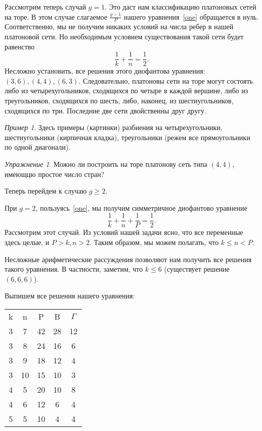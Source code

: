\documentclass[12pt, a4paper, openany]{amsart}
\theoremstyle{plain}
\theoremstyle{definition}
\theoremstyle{remark}
\newtheorem{ex}[theorem]{Упражнение}
\newtheorem{e}[theorem]{Пример}
\begin{document}
	  Рассмотрим теперь случай $g=1$. Это даст нам классификацию платоновых сетей на торе. В этом случае слагаемое $\frac{g-1}{P}$ нашего уравнения~\ref{one} обращается в нуль.  Соответственно, мы не получим никаких условий на числа ребер в нашей платоновой сети. Но необходимым условием существования такой сети будет равенство 
	  $$
	  \frac{1}{k}+\frac{1}{n}=\frac{1}{2}.
	  $$
	   Несложно установить, все решения этого диофантова уравнения:
	   $(3,6), (4,4), (6,3)$. Следовательно, платоновы сети на торе могут состоять либо из четырехугольников, сходящихся по четыре в каждой вершине,
	   либо из треугольников, сходящихся по шесть, либо, наконец, из шестиугольников, сходящихся по три. Последние две сети двойственны друг
	   другу. 
	   
\begin{e}
Здесь примеры (картинки) разбиения на четырехугольники, шестиугольники (кирпичная кладка), треугольники (режем все прямоугольники по одной диагонали).	
	
	\end{e}	   
	   
\begin{ex}
	Можно ли построить на торе платонову сеть типа $(4,4)$, имеющцю простое число стран?
\end{ex}	     


Теперь перейдем к случаю $g\ge 2$. 

При $g=2$, пользуясь~\ref{one},  мы получим симметричное диофантово уравнение	
\begin{equation}\label{two}
\frac{1}{k}+\frac{1}{n}+\frac{1}{P}=\frac{1}{2}.
\end{equation}
Рассмотрим этот случай.
Из условий нашей задачи ясно, что все переменные здесь целые, и  $P>k,n>2$.
Таким образом, мы можем полагать, что $k\le n< P$.

Несложные арифметические рассуждения позволяют нам получить все решения такого уравнения. В частности, заметим, что $k\le 6$ (существует решение $(6,6,6)$). 

Выпишем все решения нашего уравнения:


	\begin{tabular}{ccc|cc}
	k&n&P&B&$\Gamma$\\	
	3&7&42&28&12\\
	3&8&24&16&6\\
	3&9&18&12&4\\
	3&10&15&10&3\\
	4&5&20&10&8\\	
	4&6&12&6&4\\	
	5&5&10&4&4\\	
\end{tabular}
\end{document}
